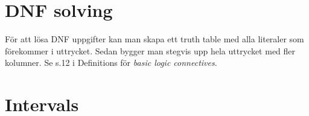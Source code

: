 \documentclass[a5paper]{article}
\begin{document}
\section*{DNF solving}
För att lösa DNF uppgifter kan man skapa ett truth table med alla literaler som förekommer i uttrycket.
Sedan bygger man stegvis upp hela uttrycket med fler kolumner.
Se s.12 i Definitions för \emph{basic logic connectives}.
\begin{figure}[ht]
	\centering
\end{figure}

\newpage
\section*{Intervals}
\end{document}
